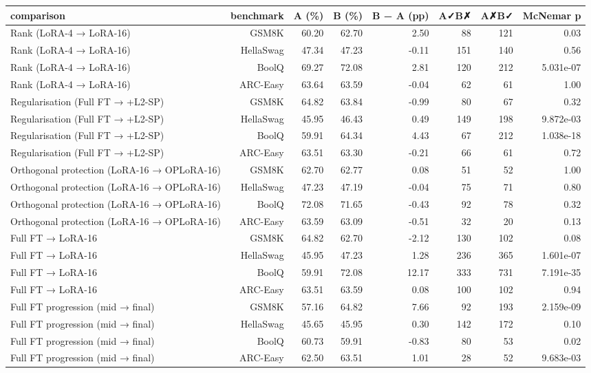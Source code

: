 \begin{tabular}{lrrrrrrr}
\toprule
comparison & benchmark & A (\%) & B (\%) & B − A (pp) & A✓B✗ & A✗B✓ & McNemar p \\
\midrule
Rank (LoRA-4 → LoRA-16) & GSM8K & 60.20 & 62.70 & 2.50 & 88 & 121 & 0.03 \\
Rank (LoRA-4 → LoRA-16) & HellaSwag & 47.34 & 47.23 & -0.11 & 151 & 140 & 0.56 \\
Rank (LoRA-4 → LoRA-16) & BoolQ & 69.27 & 72.08 & 2.81 & 120 & 212 & 5.031e-07 \\
Rank (LoRA-4 → LoRA-16) & ARC-Easy & 63.64 & 63.59 & -0.04 & 62 & 61 & 1.00 \\
Regularisation (Full FT → +L2-SP) & GSM8K & 64.82 & 63.84 & -0.99 & 80 & 67 & 0.32 \\
Regularisation (Full FT → +L2-SP) & HellaSwag & 45.95 & 46.43 & 0.49 & 149 & 198 & 9.872e-03 \\
Regularisation (Full FT → +L2-SP) & BoolQ & 59.91 & 64.34 & 4.43 & 67 & 212 & 1.038e-18 \\
Regularisation (Full FT → +L2-SP) & ARC-Easy & 63.51 & 63.30 & -0.21 & 66 & 61 & 0.72 \\
Orthogonal protection (LoRA-16 → OPLoRA-16) & GSM8K & 62.70 & 62.77 & 0.08 & 51 & 52 & 1.00 \\
Orthogonal protection (LoRA-16 → OPLoRA-16) & HellaSwag & 47.23 & 47.19 & -0.04 & 75 & 71 & 0.80 \\
Orthogonal protection (LoRA-16 → OPLoRA-16) & BoolQ & 72.08 & 71.65 & -0.43 & 92 & 78 & 0.32 \\
Orthogonal protection (LoRA-16 → OPLoRA-16) & ARC-Easy & 63.59 & 63.09 & -0.51 & 32 & 20 & 0.13 \\
Full FT → LoRA-16 & GSM8K & 64.82 & 62.70 & -2.12 & 130 & 102 & 0.08 \\
Full FT → LoRA-16 & HellaSwag & 45.95 & 47.23 & 1.28 & 236 & 365 & 1.601e-07 \\
Full FT → LoRA-16 & BoolQ & 59.91 & 72.08 & 12.17 & 333 & 731 & 7.191e-35 \\
Full FT → LoRA-16 & ARC-Easy & 63.51 & 63.59 & 0.08 & 100 & 102 & 0.94 \\
Full FT progression (mid → final) & GSM8K & 57.16 & 64.82 & 7.66 & 92 & 193 & 2.159e-09 \\
Full FT progression (mid → final) & HellaSwag & 45.65 & 45.95 & 0.30 & 142 & 172 & 0.10 \\
Full FT progression (mid → final) & BoolQ & 60.73 & 59.91 & -0.83 & 80 & 53 & 0.02 \\
Full FT progression (mid → final) & ARC-Easy & 62.50 & 63.51 & 1.01 & 28 & 52 & 9.683e-03 \\
\bottomrule
\end{tabular}
